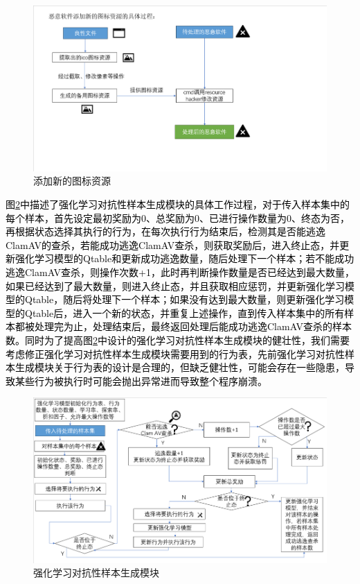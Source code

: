 \begin{figure}
  \centering
  \includegraphics[]{images/add_resources.png}
  \caption{添加新的图标资源}\label{fig:add_resources}
\end{figure}

\textcolor{black}{图\ref{fig:reinforcement_learning_adversarial_sample_generation_module}中描述了强化学习对抗性样本生成模块的具体工作过程，对于传入样本集中的每个样本，首先设定最初奖励为0、总奖励为0、已进行操作数量为0、终态为否，再根据状态选择其执行的行为，在每次执行行为结束后，检测其是否能逃逸ClamAV的查杀，若能成功逃逸ClamAV查杀，则获取奖励后，进入终止态，并更新强化学习模型的Qtable和更新成功逃逸数量，随后处理下一个样本；若不能成功逃逸ClamAV查杀，则操作次数+1，此时再判断操作数量是否已经达到最大数量，如果已经达到了最大数量，则进入终止态，并且获取相应惩罚，并更新强化学习模型的Qtable，随后将处理下一个样本；如果没有达到最大数量，则更新强化学习模型的Qtable后，进入一个新的状态，并重复上述操作，直到传入样本集中的所有样本都被处理完为止，处理结束后，最终返回处理后能成功逃逸ClamAV查杀的样本数。同时为了提高图\ref{fig:reinforcement_learning_adversarial_sample_generation_module}中设计的强化学习对抗性样本生成模块的健壮性，我们需要考虑修正强化学习对抗性样本生成模块需要用到的行为表，先前强化学习对抗性样本生成模块关于行为表的设计是合理的，但缺乏健壮性，可能会存在一些隐患，导致某些行为被执行时可能会抛出异常进而导致整个程序崩溃。}

\begin{figure}
  \centering
  \includegraphics[]{images/reinforcement_learning_adversarial_sample_generation_module.png}
  \caption{强化学习对抗性样本生成模块}\label{fig:reinforcement_learning_adversarial_sample_generation_module}
\end{figure}

